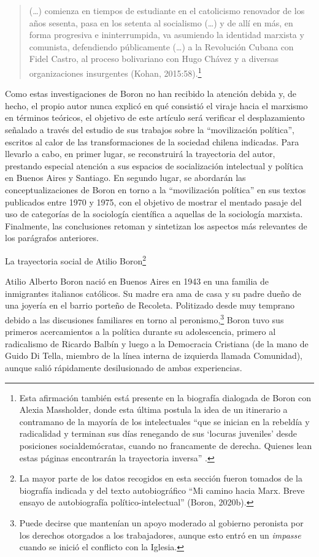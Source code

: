 \begin{quote}
(\dots) comienza en tiempos de estudiante en el catolicismo renovador de los años sesenta, pasa en los setenta al socialismo (\dots) y de allí en más, en forma progresiva e ininterrumpida, va asumiendo la identidad marxista y comunista, defendiendo públicamente (\dots) a la Revolución Cubana con Fidel Castro, al proceso bolivariano con Hugo Chávez y a diversas organizaciones insurgentes (Kohan, 2015:58).\footnote{Esta afirmación también está presente en la biografía dialogada de Boron con Alexia Massholder, donde esta última postula la idea de un itinerario a contramano de la mayoría de los intelectuales ``que se inician en la rebeldía y radicalidad y terminan sus días renegando de sus `locuras juveniles' desde posiciones socialdemócratas, cuando no francamente de derecha. Quienes lean estas páginas encontrarán la trayectoria inversa'' \parencite[8]{1444-BORON2023}.}
\end{quote}

Como estas investigaciones de Boron no han recibido la atención debida y, de hecho, el propio autor nunca explicó en qué consistió el viraje hacia el marxismo en términos teóricos, el objetivo de este artículo será verificar el desplazamiento señalado a través del estudio de sus trabajos sobre la ``movilización política'', escritos al calor de las transformaciones de la sociedad chilena indicadas. Para llevarlo a cabo, en primer lugar, se reconstruirá la trayectoria del autor, prestando especial atención a sus espacios de socialización intelectual y política en Buenos Aires y Santiago. En segundo lugar, se abordarán las conceptualizaciones de Boron en torno a la ``movilización política'' en sus textos publicados entre 1970 y 1975, con el objetivo de mostrar el mentado pasaje del uso de categorías de la sociología científica a aquellas de la sociología marxista. Finalmente, las conclusiones retoman y sintetizan los aspectos más relevantes de los parágrafos anteriores.

La trayectoria social de Atilio Boron\footnote{La mayor parte de los datos recogidos en esta sección fueron tomados de la biografía indicada \parencite{1444-BORON2023} y del texto autobiográfico ``Mi camino hacia Marx. Breve ensayo de autobiografía político-intelectual'' (Boron, 2020b).}

Atilio Alberto Boron nació en Buenos Aires en 1943 en una familia de inmigrantes italianos católicos. Su madre era ama de casa y su padre dueño de una joyería en el barrio porteño de Recoleta. Politizado desde muy temprano debido a las discusiones familiares en torno al peronismo,\footnote{Puede decirse que mantenían un apoyo moderado al gobierno peronista por los derechos otorgados a los trabajadores, aunque esto entró en un \emph{impasse} cuando se inició el conflicto con la Iglesia.} Boron tuvo sus primeros acercamientos a la política durante su adolescencia, primero al radicalismo de Ricardo Balbín y luego a la Democracia Cristiana (de la mano de Guido Di Tella, miembro de la línea interna de izquierda llamada Comunidad), aunque salió rápidamente desilusionado de ambas experiencias.

